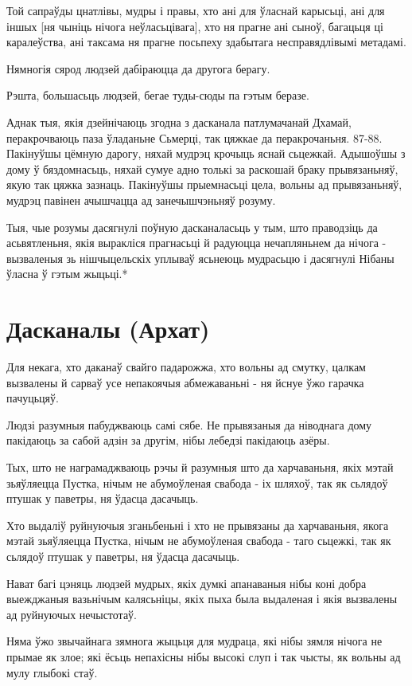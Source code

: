 \documentclass{article}
\begin{document}
Той сапраўды цнатлівы, мудры і правы, хто ані для ўласнай карысьці,
ані для іншых {[}ня чыніць нічога неўласьцівага{]}, хто ня прагне ані
сыноў, багацьця ці каралеўства, ані таксама ня прагне посьпеху здабытага
несправядлівымі метадамі.

Нямногія сярод людзей дабіраюцца да другога берагу.

Рэшта, большасьць людзей, бегае туды-сюды па гэтым беразе.

Аднак тыя, якія дзейнічаюць згодна з дасканала патлумачанай Дхамай,
перакрочваюць паза ўладаньне Сьмерці, так цяжкае да перакрочаньня.
87-88. Пакінуўшы цёмную дарогу, няхай мудрэц крочыць яснай сьцежкай.
Адышоўшы з дому ў бяздомнасьць, няхай сумуе адно толькі за раскошай
браку прывязаньняў, якую так цяжка зазнаць. Пакінуўшы прыемнасьці цела,
вольны ад прывязаньняў, мудрэц павінен ачышчацца ад занечышчэньняў
розуму.

Тыя, чые розумы дасягнулі поўную дасканаласьць у тым, што праводзіць
да асьвятленьня, якія выракліся прагнасьці й радуюцца нечапляньнем да
нічога - вызваленыя зь нішчыцельскіх уплываў ясьнеюць мудрасьцю і
дасягнулі Нібаны ўласна ў гэтым жыцьці.*

\section{Дасканалы (Архат)}

Для некага, хто даканаў свайго падарожжа, хто вольны ад смутку,
цалкам вызвалены й сарваў усе непакоячыя абмежаваньні - ня йснуе ўжо
гарачка пачуцьцяў.

Людзі разумныя пабуджваюць самі сябе. Не прывязаныя да ніводнага
дому пакідаюць за сабой адзін за другім, нібы лебедзі пакідаюць азёры.

Тых, што не награмаджваюць рэчы й разумныя што да харчаваньня, якіх
мэтай зьяўляецца Пустка, нічым не абумоўленая свабода - іх шляхоў, так
як сьлядоў птушак у паветры, ня ўдасца дасачыць.

Хто выдаліў руйнуючыя зганьбеньні і хто не прывязаны да харчаваньня,
якога мэтай зьяўляецца Пустка, нічым не абумоўленая свабода - таго
сьцежкі, так як сьлядоў птушак у паветры, ня ўдасца дасачыць.

Нават багі цэняць людзей мудрых, якіх думкі апанаваныя нібы коні
добра выежджаныя вазьнічым калясьніцы, якіх пыха была выдаленая і якія
вызвалены ад руйнуючых нечыстотаў.

Няма ўжо звычайнага зямнога жыцьця для мудраца, які нібы зямля
нічога не прымае як злое; які ёсьць непахісны нібы высокі слуп і так
чысты, як вольны ад мулу глыбокі стаў.
\end{document}
